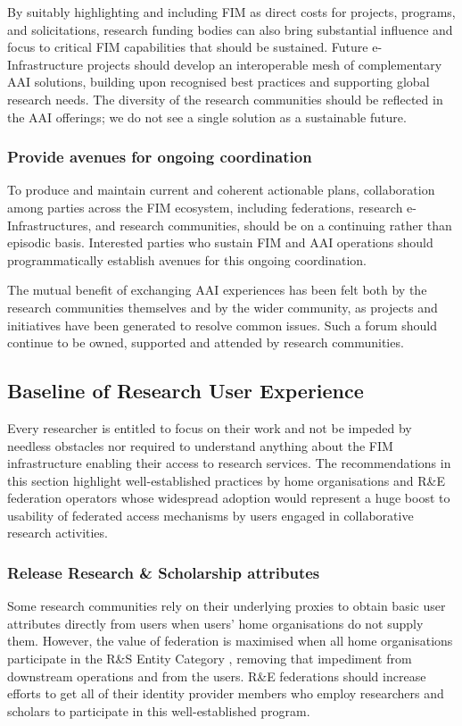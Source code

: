 \documentclass[fleqn,11pt]{wlscirep}
\begin{document}
{By suitably highlighting and including FIM as direct costs for projects, programs, and solicitations, research funding bodies can also bring substantial influence and focus to critical FIM capabilities that should be sustained.
Future e-Infrastructure projects should develop an interoperable mesh of complementary AAI solutions, building upon recognised best practices and supporting global research needs. The diversity of the research communities should be reflected in the AAI offerings; we do not see a single solution as a sustainable future. 
\subsubsection{Provide avenues for ongoing coordination} 
To produce and maintain current and coherent actionable plans, collaboration among parties across the FIM ecosystem, including federations, research e-Infrastructures, and research communities, should be on a continuing rather than episodic basis. Interested parties who sustain FIM and AAI operations should programmatically establish avenues for this ongoing coordination.

The mutual benefit of exchanging AAI experiences has been felt both by the research communities themselves and by the wider community, as projects and initiatives have been generated to resolve common issues. Such a forum should continue to be owned, supported and attended by research communities.  

\subsection{Baseline of Research User Experience}
Every researcher is entitled to focus on their work and not be impeded by needless obstacles nor required to understand anything about the FIM infrastructure enabling their access to research services. The recommendations in this section highlight well-established practices by home organisations and R\&E federation operators whose widespread adoption would represent a huge boost to usability of federated access mechanisms by users engaged in collaborative research activities. 

\subsubsection{Release Research \& Scholarship attributes}
Some research communities rely on their underlying proxies to obtain basic user attributes directly from users when users’ home organisations do not supply them. However, the value of federation is maximised when all home organisations participate in the R\&S Entity Category , removing that impediment from downstream operations and from the users. R\&E federations should increase efforts to get all of their identity provider members who employ researchers and scholars to participate in this well-established program.

}
\end{document}
